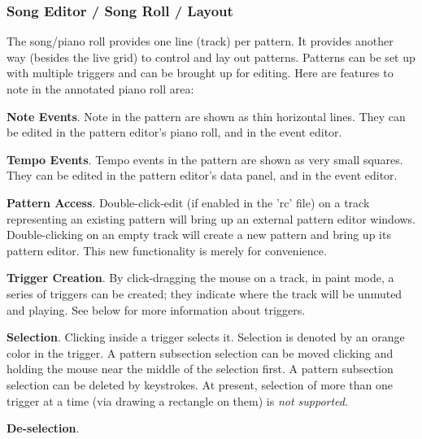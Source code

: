 \subsubsection{Song Editor / Song Roll / Layout}
\label{subsubsec:song_editor_song_roll_layout}

   The song/piano roll provides one line (track) per pattern.
   It provides another way (besides the live grid) to control
   and lay out patterns.
   Patterns can be set up with multiple triggers and can be
   brought up for editing.
   Here are features to note in the annotated piano roll area:

   \begin{enumber}
      \item \textbf{Note Events}.
         Note in the pattern are shown as thin horizontal lines.
         They can be edited in the pattern editor's piano roll,
         and in the event editor.
      \item \textbf{Tempo Events}.
         Tempo events in the pattern are shown as very small squares.
         They can be edited in the pattern editor's data panel,
         and in the event editor.
      \item \textbf{Pattern Access}.
         Double-click-edit (if enabled in the 'rc' file) on a track
         representing an existing pattern will bring up an external
         pattern editor windows.
         Double-clicking on an empty track will create a new pattern
         and bring up its pattern editor.
         This new functionality is merely for convenience.
      \item \textbf{Trigger Creation}.
         By click-dragging the mouse on a track, in paint mode,
         a series of triggers can be
         created; they indicate where the track will be unmuted and playing.
         See below for more information about triggers.
      \item \textbf{Selection}.
         Clicking inside a trigger selects it.
         Selection is denoted by
         an orange color in the trigger.
         A pattern subsection selection can be moved clicking and holding
         the mouse near the middle of the selection first.
         A pattern subsection selection can be deleted by keystrokes.
         At present, selection of more than one trigger at a time (via
         drawing a rectangle on them) is \textsl{not supported}.
      \item \textbf{De-selection}.

\end{enumber}
